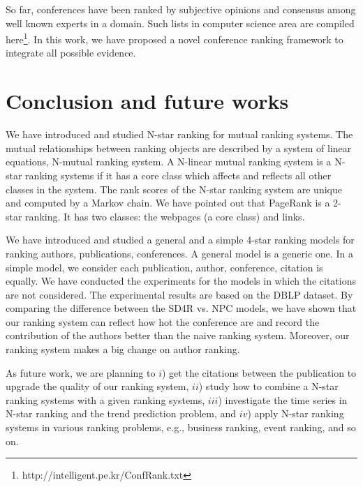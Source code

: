 \documentclass[10pt,leqno,twoside]{article}
\begin{document}
So far, conferences have been ranked by subjective opinions and consensus among well known experts in a domain.
Such lists in computer science area are compiled here\footnote{http://intelligent.pe.kr/ConfRank.txt}.
In this work, we have proposed a novel conference ranking framework to integrate all possible evidence.
\section{Conclusion and future works}\label{Sect:Conclusion}
We have introduced and studied N-star ranking for mutual ranking systems. The mutual relationships between ranking objects are described by a system of linear equations, N-mutual ranking system. A N-linear mutual ranking system is a N-star ranking systems if it has a core class which affects and reflects all other classes in the system. The rank scores of the N-star ranking system are unique and computed by a Markov chain. We have pointed out that PageRank is a 2-star ranking. It has two classes:  the webpages (a core class) and links.

We have introduced and studied a general and a simple 4-star ranking models for ranking authors, publications, conferences. A general model is a generic one. In a simple model, we consider each publication, author, conference, citation is equally. We have conducted the experiments for the models in which the citations are not considered. The experimental results are based on the DBLP dataset. By comparing the difference between the SD4R vs. NPC models, we have shown that our ranking system can reflect how hot the conference are and record the contribution of the authors better than the naive ranking system. Moreover, our ranking system makes a big change on author ranking.

As future work, we are planning to $i$) get the citations between the publication to upgrade the quality of our ranking system, $ii$) study how to combine a N-star ranking systems with a given ranking systems, $iii$) investigate the time series in N-star ranking and the trend prediction problem, and $iv$) apply N-star ranking systems in various ranking problems, e.g., business ranking, event ranking, and so on.
\end{document}
